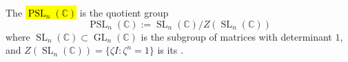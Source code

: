 \begin{definition} \label{definition:projective_special_linear_group_PSL_2_of_C}
The  \hl{$\operatorname{PSL}_n(\mathbb{C})$} is the quotient group
$$\operatorname{PSL}_n(\mathbb{C}) := \operatorname{SL}_n(\mathbb{C}) / Z(\operatorname{SL}_n(\mathbb{C}))$$
where $\operatorname{SL}_n(\mathbb{C}) \subset \operatorname{GL}_n(\mathbb{C})$ is the subgroup of matrices with determinant $1$, and $Z(\operatorname{SL}_n(\mathbb{C})) = \{\zeta I : \zeta^n = 1\}$ is its . 

\end{definition}
